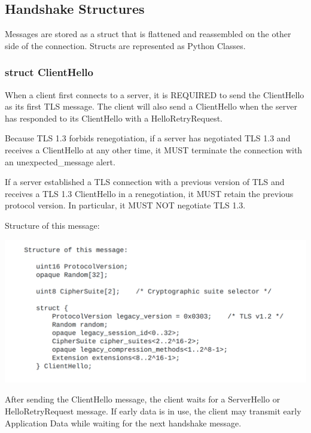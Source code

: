 \documentclass{article}
\begin{document}
\subsection{Handshake Structures}
Messages are stored as a struct that is flattened and reassembled on the other side of the connection. Structs are represented as Python Classes.
\subsubsection{struct ClientHello}
When a client first connects to a server, it is REQUIRED to send the
ClientHello as its first TLS message.  The client will also send a
ClientHello when the server has responded to its ClientHello with a
HelloRetryRequest.

Because TLS 1.3 forbids renegotiation, if a server has negotiated
TLS 1.3 and receives a ClientHello at any other time, it MUST
terminate the connection with an unexpected\_message alert.

If a server established a TLS connection with a previous version of
TLS and receives a TLS 1.3 ClientHello in a renegotiation, it MUST
retain the previous protocol version.  In particular, it MUST NOT
negotiate TLS 1.3.

Structure of this message:
\begin{center}
    \includegraphics[width=1.1\columnwidth]{media/ClientHello.png}
\end{center}


After sending the ClientHello message, the client waits for a
ServerHello or HelloRetryRequest message.  If early data is in use,
the client may transmit early Application Data while
waiting for the next handshake message.
\end{document}
